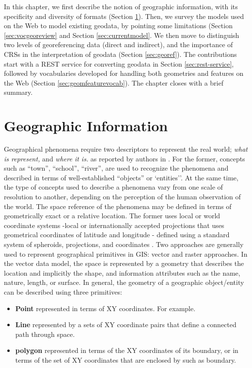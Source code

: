 In this chapter, we first describe the notion of geographic information, with its specificity and diversity of formats (Section \ref{sec:geointro}). Then, we survey the models used on the Web to model existing geodata, by pointing some limitations (Section \ref{sec:vocgeoreview} and Section \ref{sec:currentmodel}. We then move to distinguish two levels of georeferencing data (direct and indirect), and the importance of CRSs in the interpretation of geodata (Section \ref{sec:georef}). The contributions start with a REST service for converting geodata in Section \ref{sec:rest-service}, followed by vocabularies developed for handling both geometries and features on the Web (Section \ref{sec:geomfeaturevocab}). The chapter closes with a brief summary.



\section{Geographic Information}
\label{sec:geointro}

Geographical phenomena require two descriptors to represent the real world; \textit{what is represent,} and \textit{where it is.} as reported by authors in \cite{burrough98}. For the former, concepts such as ``town'', ``school'', ``river'', are used to recognize the phenomena and described in terms of well-established ``objects'' or `entities''. At the same time, the type of concepts used to describe a phenomena vary from one scale of resolution to another, depending on the perception of the human observation of the world. The space reference of the phenomena may be defined in terms of geometrically exact or a relative location. The former uses local or world coordinate systems -local or internationally accepted projections that uses geometrical coordinates of latitude and longitude - defined using a standard system of spheroids, projections, and coordinates \cite{burrough98}. Two approaches are generally used to represent geographical primitives in GIS: vector and raster approaches. In the vector data model, the space is represented by a geometry that describes the location and implicitly the shape, and information attributes such as the name, nature, length, or surface. In general, the geometry of a geographic object/entity can be described using three primitives:
\begin{itemize}
\item \textbf{Point} represented in terms of XY coordinates. For example. 
\item \textbf{Line} represented by a sets of XY coordinate pairs that define a connected path through space. 
\item \textbf{polygon} represented in terms of the XY coordinates of its boundary, or in terms of the set of XY coordinates that are enclosed by such as boundary. 
\end{itemize}    

